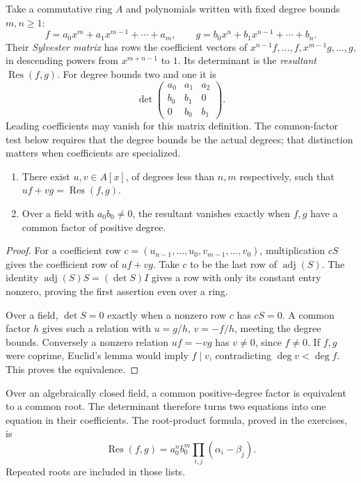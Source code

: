 Take a commutative ring $A$ and polynomials written with fixed degree bounds $m,n\ge1$:
\[
f=a_0x^m+a_1x^{m-1}+\cdots+a_m,\qquad
g=b_0x^n+b_1x^{n-1}+\cdots+b_n.
\]
Their \emph{Sylvester matrix} has rows the coefficient vectors of $x^{n-1}f,\ldots,f,x^{m-1}g,\ldots,g$, in descending powers from $x^{m+n-1}$ to $1$. Its determinant is the \emph{resultant} $\operatorname{Res}(f,g)$. For degree bounds two and one it is
\[
\det\begin{pmatrix}a_0&a_1&a_2\\b_0&b_1&0\\0&b_0&b_1\end{pmatrix}.
\]
Leading coefficients may vanish for this matrix definition. The common-factor test below requires that the degree bounds be the actual degrees; that distinction matters when coefficients are specialized.

\begin{proposition}\label{geometry:prop:resultant}
\begin{enumerate}
\item There exist $u,v\in A[x]$, of degrees less than $n,m$ respectively, such that $uf+vg=\operatorname{Res}(f,g)$.
\item Over a field with $a_0b_0\ne0$, the resultant vanishes exactly when $f,g$ have a common factor of positive degree.
\end{enumerate}
\end{proposition}
\begin{proof}
For a coefficient row $c=(u_{n-1},\ldots,u_0,v_{m-1},\ldots,v_0)$, multiplication $cS$ gives the coefficient row of $uf+vg$. Take $c$ to be the last row of $\operatorname{adj}(S)$. The identity $\operatorname{adj}(S)S=(\det S)I$ gives a row with only its constant entry nonzero, proving the first assertion even over a ring.

Over a field, $\det S=0$ exactly when a nonzero row $c$ has $cS=0$. A common factor $h$ gives such a relation with $u=g/h$, $v=-f/h$, meeting the degree bounds. Conversely a nonzero relation $uf=-vg$ has $v\ne0$, since $f\ne0$. If $f,g$ were coprime, Euclid's lemma would imply $f\mid v$, contradicting $\deg v<\deg f$. This proves the equivalence.
\end{proof}

Over an algebraically closed field, a common positive-degree factor is equivalent to a common root. The determinant therefore turns two equations into one equation in their coefficients. The root-product formula, proved in the exercises, is
\[
\operatorname{Res}(f,g)=a_0^nb_0^m\prod_{i,j}(\alpha_i-\beta_j).
\]
Repeated roots are included in those lists.

